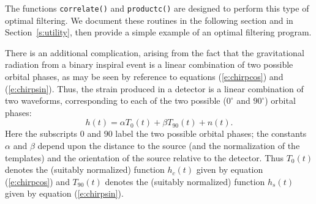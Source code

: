 The functions {\tt correlate()} and {\tt productc()} are designed to
perform this type of optimal filtering.  We document these routines in
the following section and in Section~\ref{s:utility}, then provide a simple
example of an optimal filtering program.

There is an additional complication, arising from the fact that the
gravitational radiation from a binary inspiral event is a linear
combination of two possible orbital phases, as may be seen by reference
to equations (\ref{e:chirpcos}) and (\ref{e:chirpsin}).  Thus, the
strain produced in a detector is a linear combination of two waveforms,
corresponding to each of the two possible ($0^\circ$ and $90^\circ$)
orbital phases:
\begin{equation}
h(t) = \alpha T_{0}(t) + \beta T_{90}(t) + n(t).
\end{equation}
Here the subscripts $0$ and $90$ label the two possible orbital phases;
the constants $\alpha$ and $\beta$ depend upon the distance to the source
(and the normalization of the templates) and the orientation of the source
relative to the detector.  Thus $ T_{0}(t) $ denotes the (suitably
normalized) function $h_c(t)$ given by equation (\ref{e:chirpcos})
and $ T_{90}(t) $ denotes the (suitably normalized) function $h_s(t)$
given by equation (\ref{e:chirpsin}).

